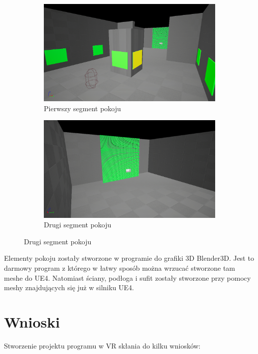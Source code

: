 \documentclass[a4paper,12pt,reqno]{article}
\begin{document}
\begin{figure}[H]%
	\centering
	\begin{subfigure}{.5\textwidth}
		\centering
		\includegraphics[width=0.8\linewidth]{graphics/05/GalleryRoom.png}
		\caption{Pierwszy segment pokoju }	
		\label{ref:subref_a}
	\end{subfigure}%
	\begin{subfigure}{.5\textwidth}
		\centering
		\includegraphics[width=0.8\linewidth]{graphics/05/GalleryRoom2.png}
		\caption{Drugi segment pokoju}
		\label{ref:subref_b}
	\end{subfigure}%
\label{ref:ref}
\end{figure}

Elementy pokoju zostały stworzone w programie do grafiki 3D Blender3D. Jest to darmowy program z którego w łatwy sposób można wrzucać stworzone tam meshe do UE4.
Natomiast ściany, podłoga i sufit zostały stworzone przy pomocy meshy znajdujących się już w silniku UE4.

\section{Wnioski}


Stworzenie projektu programu w VR skłania do kilku wniosków:
\end{document}

